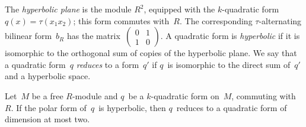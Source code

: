 \documentclass{lms}
\def\mat#1{\begin{pmatrix}#1\end{pmatrix}}
\begin{document}
The \emph{hyperbolic plane} is the module $R^2$, equipped with the
$k$-quadratic form~$q(x) = τ(x_1 x_2)$; this form commutes with~$R$. The
corresponding $τ$-alternating bilinear form~$b_R$ has the
matrix~$\mat{0&1\\1&0}$. A quadratic form is \emph{hyperbolic} if it is
isomorphic to the orthogonal sum of copies of the hyperbolic plane.
We say that a quadratic form~$q$ \emph{reduces} to a form~$q'$ if $q$~is
isomorphic to the direct sum of~$q'$ and a hyperbolic space.

\begin{prop}\label{prop:witt-four}
Let~$M$ be a free $R$-module and $q$~be a $k$-quadratic form on~$M$,
commuting with~$R$.
If the polar form of~$q$~is hyperbolic, then $q$~reduces to a quadratic
form of dimension at most two.
\end{prop}
\end{document}
